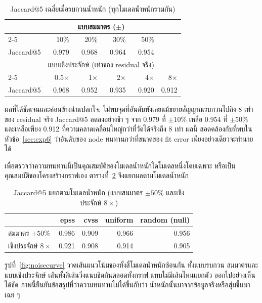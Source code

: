 \begin{table}[H]
\centering
\caption{Jaccard@5 เฉลี่ยเมื่อรบกวนน้ำหนัก (ทุกโมเดลน้ำหนักรวมกัน)}\label{tab:noise}
\small
\begin{tabular}{lrrrrr}
\toprule
& \multicolumn{4}{c}{แบบสมมาตร ($\pm$)} & \\
\cmidrule(lr){2-5}
& 10\% & 20\% & 30\% & 50\% & \\
Jaccard@5 & 0.979 & 0.968 & 0.964 & 0.954 & \\
\midrule
& \multicolumn{4}{c}{แบบเชิงประจักษ์ (เท่าของ residual จริง)} & \\
\cmidrule(lr){2-5}
& 0.5$\times$ & 1$\times$ & 2$\times$ & 4$\times$ & 8$\times$ \\
Jaccard@5 & 0.968 & 0.952 & 0.935 & 0.920 & 0.912 \\
\bottomrule
\end{tabular}
\end{table}

ผลที่ได้ชัดเจนและค่อนข้างน่าแปลกใจ: ไม่พบจุดที่อันดับพังเลยแม้ขยายสัญญาณรบกวนไปถึง
8 เท่าของ residual จริง Jaccard@5 ลดลงอย่างช้า ๆ จาก 0.979 ที่ $\pm10\%$ เหลือ 0.954
ที่ $\pm50\%$ และเหลือเพียง 0.912 ที่ความคลาดเคลื่อนใหญ่กว่าที่วัดได้จริงถึง 8 เท่า ผลนี้
สอดคล้องกับที่พบในหัวข้อ~\ref{sec:exp6} ว่าอันดับของ node ทนทานกว่าที่ขนาดของ fit
error เพียงอย่างเดียวจะทำนายได้

เพื่อตรวจว่าความทนทานนี้เป็นคุณสมบัติของโมเดลน้ำหนักใดโมเดลหนึ่งโดยเฉพาะ หรือเป็น
คุณสมบัติของโครงสร้างกราฟเอง ตารางที่~\ref{tab:noise_model} จึงแยกผลตามโมเดลน้ำหนัก

\begin{table}[H]
\centering
\caption{Jaccard@5 แยกตามโมเดลน้ำหนัก (แบบสมมาตร $\pm50\%$ และเชิงประจักษ์ $8\times$)}\label{tab:noise_model}
\small
\begin{tabular}{lrrrr}
\toprule
& epss & cvss & uniform & random (null) \\
\midrule
สมมาตร $\pm50\%$ & 0.986 & 0.909 & 0.966 & 0.956 \\
เชิงประจักษ์ $8\times$ & 0.921 & 0.908 & 0.914 & 0.905 \\
\bottomrule
\end{tabular}
\end{table}

รูปที่~\ref{fig:noisecurve} วาดเส้นแนวโน้มของทั้งสี่โมเดลน้ำหนักซ้อนกัน ทั้งแบบรบกวน
สมมาตรและแบบเชิงประจักษ์ เส้นทั้งสี่เส้นวิ่งแนบชิดกันตลอดทั้งกราฟ แทบไม่มีเส้นไหนแยกตัว
ออกไปอย่างเห็นได้ชัด ภาพนี้ยืนยันข้อสรุปที่ว่าความทนทานไม่ได้ขึ้นกับว่า
น้ำหนักนั้นมาจากข้อมูลจริงหรือสุ่มขึ้นมาเฉย ๆ

